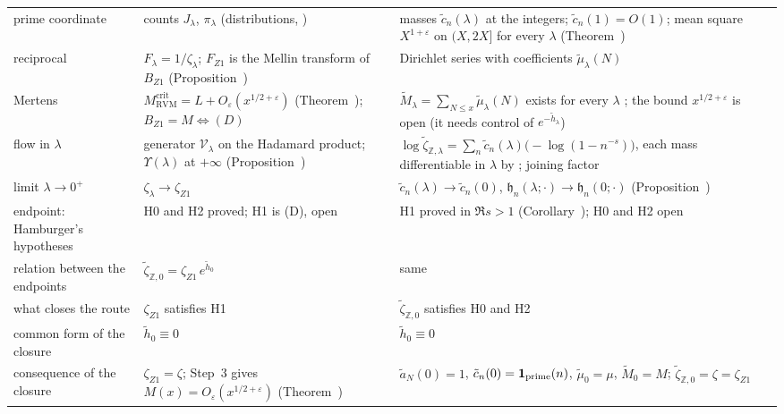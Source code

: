 \documentclass[11pt,reqno]{amsart}
\makeatletter
\let\CG@origref\ref
\let\CG@origeqref\eqref
\newcommand{\CG@gettip}[1]{\@ifundefined{CGTip@#1}{Reference: #1}{\csname CGTip@#1\endcsname}}
\DeclareRobustCommand{\CGref}[1]{\pdftooltip{\CG@origref{#1}}{\CG@gettip{#1}}}
\DeclareRobustCommand{\CGeqref}[1]{\pdftooltip{\CG@origeqref{#1}}{\CG@gettip{#1}}}
\numberwithin{equation}{section}
\theoremstyle{plain}
\theoremstyle{definition}
\theoremstyle{remark}
\newcommand{\Z}{\mathbb Z}
\newcommand{\eps}{\varepsilon}
\newcommand{\RVM}{\mathrm{RVM}}
\newcommand{\crit}{\mathrm{crit}}
\makeatother
\begin{document}
\begin{longtable}{>{\raggedright\arraybackslash}p{}>{\raggedright\arraybackslash}p{}>{\raggedright\arraybackslash}p{}}
prime coordinate & counts $J_\lambda$, $\pi_\lambda$ (distributions, \CGeqref{eq:J-X}) & masses $\tilde c_n(\lambda)$ at the integers; $\tilde c_n(1)=O(1)$; mean square $X^{1+\eps}$ on $(X,2X]$ for every $\lambda$ (Theorem~\CGref{thm:mean-square-cells})\\
reciprocal & $F_\lambda=1/\zeta_\lambda$; $F_{Z1}$ is the Mellin transform of $B_{Z1}$ (Proposition~\CGref{prop:Mellin-Mertens}) & Dirichlet series with coefficients $\tilde\mu_\lambda(N)$ \CGeqref{eq:atomized-mobius}\\
Mertens & $M^{\crit}_{\RVM}=L+O_\eps(x^{1/2+\eps})$ (Theorem~\CGref{thm:unsmoothed-RVM}); $B_{Z1}=M\iff(D)$ & $\tilde M_\lambda=\sum_{N\le x}\tilde\mu_\lambda(N)$ exists for every $\lambda$ \CGeqref{eq:atomized-mertens}; the bound $x^{1/2+\eps}$ is open (it needs control of $e^{-\tilde h_\lambda}$)\\
flow in $\lambda$ & generator $\mathcal V_\lambda$ on the Hadamard product; $\Upsilon(\lambda)$ at $+\infty$ (Proposition~\CGref{prop:family-flow}) & $\log\tilde\zeta_{\Z,\lambda}=\sum_n\tilde c_n(\lambda)\bigl(-\log(1-n^{-s})\bigr)$, each mass differentiable in $\lambda$ by \CGeqref{eq:J-lambda-derivative}; joining factor \CGeqref{eq:joining-derivative}\\
limit $\lambda\to0^+$ & $\zeta_\lambda\to\zeta_{Z1}$ & $\tilde c_n(\lambda)\to\tilde c_n(0)$, $\mathfrak h_n(\lambda;\cdot)\to\mathfrak h_n(0;\cdot)$ (Proposition~\CGref{prop:cell-limit})\\
endpoint: Hamburger's hypotheses & H0 and H2 proved; H1 is (D), open & H1 proved in $\Re s>1$ (Corollary~\CGref{cor:abscissa-one}); H0 and H2 open\\
relation between the endpoints & $\tilde\zeta_{\Z,0}=\zeta_{Z1}\,e^{\tilde h_0}$ & same\\
what closes the route & $\zeta_{Z1}$ satisfies H1 & $\tilde\zeta_{\Z,0}$ satisfies H0 and H2\\
common form of the closure & $\tilde h_0\equiv0$ & $\tilde h_0\equiv0$\\
consequence of the closure & $\zeta_{Z1}=\zeta$; Step~3 gives $M(x)=O_\eps(x^{1/2+\eps})$ (Theorem~\CGref{thm:step3}) & $\tilde a_N(0)=1$, $\tilde c_n(0)=\mathbf 1_{\rm prime}(n)$, $\tilde\mu_0=\mu$, $\tilde M_0=M$; $\tilde\zeta_{\Z,0}=\zeta=\zeta_{Z1}$\\
\end{longtable}
\endgroup
\end{document}
